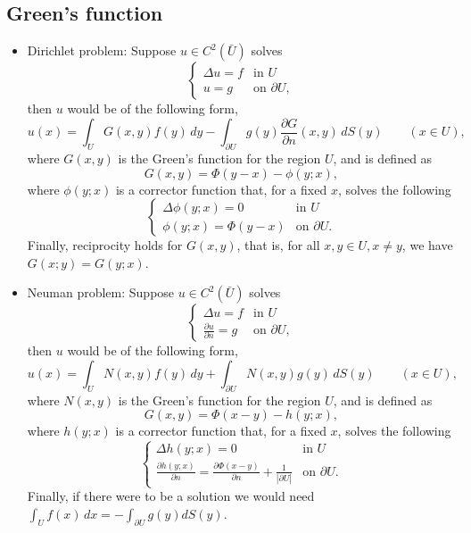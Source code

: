 \documentclass[oneside,a4paper,11pt]{report}
\begin{document}
\subsection{Green's function}
\begin{itemize}
\item Dirichlet problem: Suppose $u \in C^2(\bar{U})$ solves
\[ \begin{cases}
\Delta u = f & \text{in } U \\
u = g & \text{on } \partial U,
\end{cases}\]
then $u$ would be of the following form,
\[ u(x) = \int_{U} G(x,y) f(y)\,dy - \int_{\partial U} g(y) \frac{\partial G}{\partial n}(x,y) \,dS(y) \qquad (x \in U),\]
where $G(x,y)$ is the Green's function for the region $U$, and is defined as
\[G(x,y) = \Phi(y-x) - \phi(y;x),\]
where $\phi(y;x)$ is a corrector function that, for a fixed $x$, solves the following
\[ \begin{cases}
\Delta \phi(y;x) = 0 & \text{in } U\\
\phi(y;x) = \Phi(y-x) & \text{on } \partial U.
\end{cases}\]
Finally, reciprocity holds for $G(x,y)$, that is, for all $x,y \in U, x\neq y$, we have $G(x;y) = G(y;x)$.

\item Neuman problem: Suppose $u \in C^2(\bar{U})$ solves
\[ \begin{cases}
\Delta u = f & \text{in } U \\
\frac{\partial u}{\partial n} = g & \text{on } \partial U,
\end{cases}\]
then $u$ would be of the following form,
\[ u(x) = \int_{U} N(x,y)f(y) \,dy  + \int_{\partial U} N(x,y)g(y) \,dS(y)\qquad (x \in U),\]
where $N(x,y)$ is the Green's function for the region $U$, and is defined as
\[G(x,y) = \Phi(x-y) - h(y;x),\]
where $h(y;x)$ is a corrector function that, for a fixed $x$, solves the following
\[ \begin{cases}
\Delta h(y;x) = 0 & \text{in } U\\
\frac{\partial h(y;x)}{\partial n} = \frac{\partial \Phi(x-y)}{\partial n} + \frac{1}{|\partial U|} & \text{on } \partial U.
\end{cases}\]
Finally, if there were to be a solution we would need $\int_U f(x)\,dx = -\int_{\partial U} g(y) dS(y)$.

\end{itemize}

\end{document}
